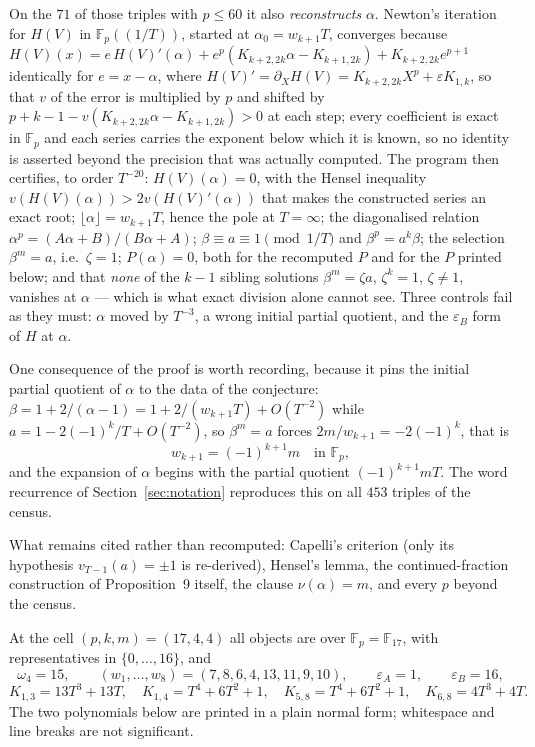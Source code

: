 \documentclass[11pt]{amsart}
\theoremstyle{remark}
\newcommand{\Fp}{\mathbb F_p}
\newcommand{\Kc}[2]{K_{#1,#2}}
\newcommand{\HV}{H(V)}
\begin{document}
On the $71$ of those triples with $p\le60$ it also \emph{reconstructs} $\alpha$. Newton's iteration
for $\HV$ in $\Fp((1/T))$, started at $\alpha_0=w_{k+1}T$, converges because
$\HV(x)=e\,\HV'(\alpha)+e^p(\Kc{k+2}{2k}\alpha-\Kc{k+1}{2k})+\Kc{k+2}{2k}e^{p+1}$ identically for
$e=x-\alpha$, where $\HV'=\partial_X\HV=\Kc{k+2}{2k}X^p+\varepsilon\Kc1k$, so that $v$ of the error
is multiplied by $p$ and shifted by
$p+k-1-v(\Kc{k+2}{2k}\alpha-\Kc{k+1}{2k})>0$ at each step; every coefficient is exact in $\Fp$ and
each series carries the exponent below which it is known, so no identity is asserted beyond the
precision that was actually computed. The program then certifies, to order $T^{-20}$:
$\HV(\alpha)=0$, with the Hensel inequality $v(\HV(\alpha))>2v(\HV'(\alpha))$ that makes the
constructed series an exact root; $\lfloor\alpha\rfloor=w_{k+1}T$, hence the pole at $T=\infty$;
the diagonalised relation $\alpha^p=(A\alpha+B)/(B\alpha+A)$; $\beta\equiv a\equiv1\pmod{1/T}$ and
$\beta^p=a^k\beta$; the selection $\beta^m=a$, i.e.\ $\zeta=1$; $P(\alpha)=0$, both for the
recomputed $P$ and for the $P$ printed below; and that \emph{none} of the $k-1$ sibling solutions
$\beta^m=\zeta a$, $\zeta^k=1$, $\zeta\ne1$, vanishes at $\alpha$ --- which is what exact division
alone cannot see. Three controls fail as they must: $\alpha$ moved by $T^{-3}$, a wrong initial
partial quotient, and the $\varepsilon_B$ form of $H$ at $\alpha$.

One consequence of the proof is worth recording, because it pins the initial partial quotient of
$\alpha$ to the data of the conjecture: $\beta=1+2/(\alpha-1)=1+2/(w_{k+1}T)+O(T^{-2})$ while
$a=1-2(-1)^k/T+O(T^{-2})$, so $\beta^m=a$ forces $2m/w_{k+1}=-2(-1)^k$, that is
\[
 w_{k+1}=(-1)^{k+1}m\quad\text{in }\Fp,
\]
and the expansion of $\alpha$ begins with the partial quotient $(-1)^{k+1}mT$. The word recurrence of
Section~\ref{sec:notation} reproduces this on all $453$ triples of the census.

What remains cited rather than recomputed: Capelli's criterion (only its hypothesis
$v_{T-1}(a)=\pm1$ is re-derived), Hensel's lemma, the continued-fraction construction of
Proposition~9 itself, the clause $\nu(\alpha)=m$, and every $p$ beyond the census.

At the cell $(p,k,m)=(17,4,4)$ all objects are over $\Fp=\mathbb F_{17}$, with representatives in
$\{0,\dots,16\}$, and
\[
 \omega_4=15,\qquad (w_1,\dots,w_8)=(7,8,6,4,13,11,9,10),\qquad
 \varepsilon_A=1,\qquad \varepsilon_B=16,
\]
\[
 \Kc13=13T^3+13T,\quad \Kc14=T^4+6T^2+1,\quad
 \Kc58=T^4+6T^2+1,\quad \Kc68=4T^3+4T.
\]
The two polynomials below are printed in a plain normal form; whitespace and line breaks are not
significant.
\end{document}
